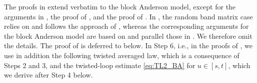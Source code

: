 The proofs in  extend verbatim to the block Anderson model, except for the arguments in , the proof of , and the proof of . In , the random band matrix case relies on  and follows the approach of \cite[Section 5.3]{YY_25}, whereas the corresponding arguments for the block Anderson model are based on  and parallel those in \cite[Section 7.3]{RBSO1D}. We therefore omit the details.
The proof of  is deferred to  below.
In Step 6, i.e., in the proofs of , we use in addition the following twisted averaged law, which is a consequence of Steps 2 and 3, and the twisted-loop estimate \eqref{eq:TL2_BA} for $u\in[s,t]$, which we derive after Step 4 below.

